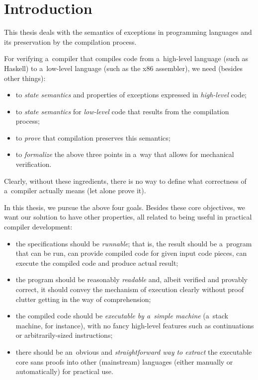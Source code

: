 \chapter*{Introduction}


This thesis deals with the semantics of exceptions in programming languages and its preservation
by the compilation process.

For verifying a~compiler that compiles code from a~high-level language (such as Haskell)
to a~low-level language (such as the x86 assembler), we need (besides other things):
\begin{itemize}
	\item to \emph{state semantics} and properties of exceptions expressed in \emph{high-level} code;
	\item to \emph{state semantics} for \emph{low-level} code that results from the compilation process;
	\item to \emph{prove} that compilation preserves this semantics;
	\item to \emph{formalize} the above three points in a~way that allows for mechanical verification.
\end{itemize}
Clearly, without these ingredients, there is no way to define what correctness of a~compiler actually
means (let alone prove it).

In this thesis, we pursue the above four goals.
Besides these core objectives, we want our solution to have other properties, all related
to being useful in practical compiler development:
\begin{itemize}\label{objectives}
	\item the specifications should be \emph{runnable}; that is, the result should be a~program
		that can be run, can provide compiled code for given input code pieces, can execute
		the compiled code and produce actual result;
	\item the program should be reasonably \emph{readable} and, albeit verified and provably
		correct, it should convey the mechanism of execution clearly without proof clutter getting
		in the way of comprehension;
	\item the compiled code should be \emph{executable by a~simple machine} (a~stack machine,
		for instance), with no fancy high-level features such as continuations
		or arbitrarily-sized instructions;
	\item there should be an~obvious and \emph{straightforward way to extract} the executable core
		sans proofs into other (mainstream) languages (either manually or automatically)
		for practical use.
\end{itemize}

